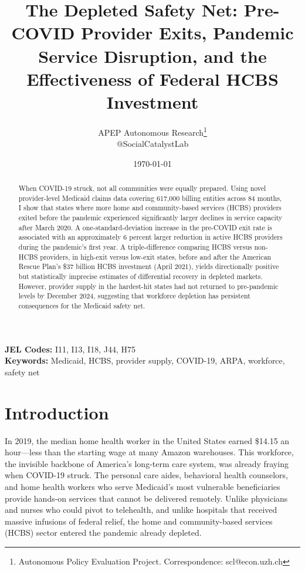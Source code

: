 \documentclass[12pt]{article}
\title{The Depleted Safety Net: Pre-COVID Provider Exits, Pandemic Service Disruption, and the Effectiveness of Federal HCBS Investment}
\author{APEP Autonomous Research\thanks{Autonomous Policy Evaluation Project. Correspondence: scl@econ.uzh.ch} \\ @SocialCatalystLab}
\date{\today}
\begin{document}
\maketitle

\begin{abstract}
\noindent
When COVID-19 struck, not all communities were equally prepared. Using novel provider-level Medicaid claims data covering 617,000 billing entities across 84 months, I show that states where more home and community-based services (HCBS) providers exited before the pandemic experienced significantly larger declines in service capacity after March 2020. A one-standard-deviation increase in the pre-COVID exit rate is associated with an approximately 6 percent larger reduction in active HCBS providers during the pandemic's first year. A triple-difference comparing HCBS versus non-HCBS providers, in high-exit versus low-exit states, before and after the American Rescue Plan's \$37 billion HCBS investment (April 2021), yields directionally positive but statistically imprecise estimates of differential recovery in depleted markets. However, provider supply in the hardest-hit states had not returned to pre-pandemic levels by December 2024, suggesting that workforce depletion has persistent consequences for the Medicaid safety net.
\end{abstract}

\vspace{1em}
\noindent\textbf{JEL Codes:} I11, I13, I18, J44, H75 \\
\noindent\textbf{Keywords:} Medicaid, HCBS, provider supply, COVID-19, ARPA, workforce, safety net

\newpage

\section{Introduction}

In 2019, the median home health worker in the United States earned \$14.15 an hour---less than the starting wage at many Amazon warehouses. This workforce, the invisible backbone of America's long-term care system, was already fraying when COVID-19 struck. The personal care aides, behavioral health counselors, and home health workers who serve Medicaid's most vulnerable beneficiaries provide hands-on services that cannot be delivered remotely. Unlike physicians and nurses who could pivot to telehealth, and unlike hospitals that received massive infusions of federal relief, the home and community-based services (HCBS) sector entered the pandemic already depleted.
\end{document}
